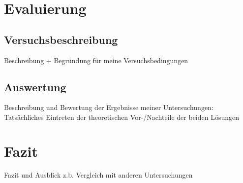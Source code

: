 
\chapter{Evaluierung}
\section{Versuchsbeschreibung}
Beschreibung + Begründung für meine Versuchsbedingungen
\section{Auswertung}
Beschreibung und Bewertung der Ergebnisse meiner Untersuchungen: Tatsächliches Eintreten der theoretischen Vor-/Nachteile der beiden Lösungen

\chapter{Fazit}
Fazit und Ausblick
z.b. Vergleich mit anderen Untersuchungen

